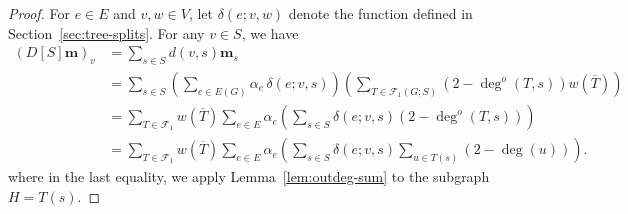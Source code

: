 \documentclass{amsart}
\theoremstyle{definition}
\newcommand{\boldm}{\mathbf{m}}
\newcommand{\trees}{\mathcal{F}_1}
\newcommand{\degout}{\deg^o}
\begin{document}
\begin{proof}
For $e\in E$ and $v,w\in V$, let $\delta(e;v,w)$ denote the function defined in Section~\ref{sec:tree-splits}.
For any $v \in S$, we have
\begin{align}
  (D[S] \boldm)_v &= \sum_{s \in S} d(v,s) \boldm_s \\
  &= \sum_{s \in S} \left( \sum_{e \in E(G)} \alpha_e\, \delta(e; v,s) \right) \left( \sum_{T \in \trees(G;S)} (2 - \degout(T,s)) w(\overline{T}) \right) \\
  &= \sum_{T\in \trees} w(\overline{T}) \sum_{e\in E} \alpha_e \left( \sum_{s \in S} \delta(e; v,s) (2 - \deg^o(T, s)) \right) \\
  &= \sum_{T \in \trees} w(\overline{T}) \sum_{e \in E} \alpha_e \left( \sum_{s \in S} \delta(e; v,s) \sum_{u \in T(s)} (2 - \deg(u)) \right). \label{eq:14-1}
\end{align}
where in the last equality, we apply Lemma~\ref{lem:outdeg-sum} to the subgraph $H = T(s)$.


\end{proof}
\end{document}
